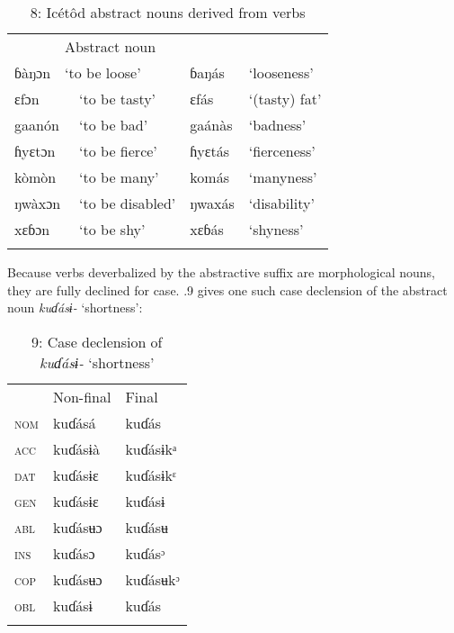 \begin{table}
\caption{8: Icétôd abstract nouns derived from verbs}
\label{tab:8}


\begin{tabularx}{\textwidth}{XXXXX}
\lsptoprule

\multicolumn{3}{X}{Intransitive infinitive} & \multicolumn{2}{X}{Abstract noun}\\
ɓàŋɔn & \multicolumn{2}{X}{ ‘to be loose’} & ɓaŋás & ‘looseness’\\
\multicolumn{2}{X}{ɛfɔn} & ‘to be tasty’ & ɛfás & ‘(tasty) fat’\\
\multicolumn{2}{X}{gaanón} & ‘to be bad’ & gaánàs & ‘badness’\\
\multicolumn{2}{X}{ɦyɛtɔn} & ‘to be fierce’ & ɦyɛtás & ‘fierceness’\\
\multicolumn{2}{X}{kòmòn} & ‘to be many’ & komás & ‘manyness’\\
\multicolumn{2}{X}{ŋwàxɔn} & ‘to be disabled’ & ŋwaxás & ‘disability’\\
\multicolumn{2}{X}{xɛɓɔn} & ‘to be shy’ & xɛɓás & ‘shyness’\\
\lspbottomrule
\end{tabularx}
\end{table}
Because verbs deverbalized by the abstractive suffix are morphological nouns, they are fully declined for case. .9 gives one such case declension of the abstract noun \textit{kuɗásɨ-} ‘shortness’:


\begin{table}
\caption{9: Case declension of \textit{kuɗásɨ-} ‘shortness’}
\label{tab:8}


\begin{tabularx}{\textwidth}{XXX} & Non-final & Final\\
\lsptoprule
\textsc{nom} & kuɗásá & kuɗás\\
\textsc{acc} & kuɗásɨà & kuɗásɨkᵃ\\
\textsc{dat} & kuɗásɨɛ & kuɗásɨkᵋ\\
\textsc{gen} & kuɗásɨɛ & kuɗásɨ\\
\textsc{abl} & kuɗásʉɔ & kuɗásʉ\\
\textsc{ins} & kuɗásɔ & kuɗásᵓ\\
\textsc{cop} & kuɗásʉɔ & kuɗásʉkᵓ\\
\textsc{obl} & kuɗásɨ & kuɗás\\
\lspbottomrule
\end{tabularx}
\end{table}


